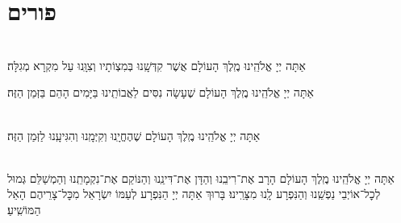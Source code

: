 \documentclass[twoside, openany, parskip=half, 11pt]{book}
\begin{document}
\vfill
\sepline

\chapter[פורים]{ פורים }

\label{purim}

\\
אַתָּה יְיָ אֱלֹהֵֽינוּ מֶֽלֶךְ הָעוֹלָם
אֲשֶׁר קִדְּשָֽׁנוּ בְּמִצְוֹתָיו וְצִוָּֽנוּ עַל מִקְרָא מְגִלָּה׃


אַתָּה יְיָ אֱלֹהֵֽינוּ מֶֽלֶךְ הָעוֹלָם שֶׁעָשָׂה נִסִּים לַאֲבוֹתֵֽינוּ בַּיָּמִים הָהֵם בַּזְּמַן הַזֶּה׃

\\
אַתָּה יְיָ אֱלֹהֵֽינוּ מֶֽלֶךְ הָעוֹלָם שֶׁהֶחֱיָֽנוּ וְקִיְּמָֽנוּ וְהִגִּיעָֽנוּ לַזְּמַן הַזֶּה׃


 \\
אַתָּה יְיָ אֱלֹהֵֽינוּ מֶֽלֶךְ הָעוֹלָם הָרָב אֶת־רִיבֵֽנוּ וְהַדָּן אֶת־דִּינֵֽנוּ וְהַנּוֹקֵם אֶת־נִקְמָתֵֽנוּ וְהַמְשַׁלֵּם גְּמוּל לְכׇל־אוֹיְבֵי נַפְשֵֽׁנוּ וְהַנִּפְרָע לָֽנוּ מִצָּרֵֽינוּ׃ בָּרוּךְ אַתָּה יְיָ הַנִּפְרָע לְעַמּוֹ יִשְׂרָאֵל מִכׇּל־צָרֵיהֶם הָאֵל הַמּוֹשִֽׁיעַ׃

\end{document}
